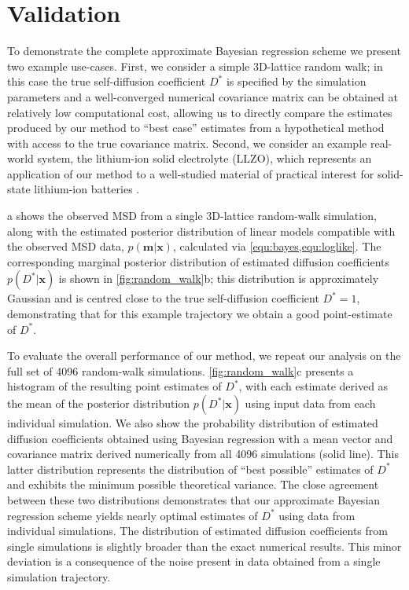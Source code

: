 \documentclass[reprint,superscriptaddress,nobibnotes,amsmath,amssymb,aps,prx,hidelinks]{revtex4-2}
\newcommand{\oMSD}{\ensuremath{\bm{x}}}
\newcommand{\model}{\bm{m}}
\newcommand{\prob}[1]{\ensuremath{p(#1)}}
\newcommand{\D}{\ensuremath{D^*}}
\begin{document}
\section{Validation}

To demonstrate the complete approximate Bayesian regression scheme we present two example use-cases.
First, we consider a simple 3D-lattice random walk; in this case the true self-diffusion coefficient $\D$ is specified by the simulation parameters and a well-converged numerical covariance matrix can be obtained at relatively low computational cost, allowing us to directly compare the estimates produced by our method to ``best case'' estimates from a hypothetical method with access to the true covariance matrix.
Second, we consider an example real-world system, the lithium-ion solid electrolyte  (LLZO), which represents an application of our method to a well-studied material of practical interest for solid-state lithium-ion batteries \cite{MuruganEtAl_AngewChemIntEd2007,burbano_sparse_2016,morgan_lattice_2017,SquiresEtAl_PhysRevMater2022}.

a shows the observed MSD from a single 3D-lattice random-walk simulation, along with the estimated posterior distribution of linear models compatible with the observed MSD data, $\prob{\model|\oMSD}$, calculated via \cref{equ:bayes,equ:loglike}.
The corresponding marginal posterior distribution of estimated diffusion coefficients $\prob{\D|\oMSD}$ is shown in \cref{fig:random_walk}b; this distribution is approximately Gaussian and is centred close to the true self-diffusion coefficient $\D = \num{1}$, demonstrating that for this example trajectory we obtain a good point-estimate of $\D$.

To evaluate the overall performance of our method, we repeat our analysis on the full set of \num{4096} random-walk simulations.
\cref{fig:random_walk}c presents a histogram of the resulting point estimates of $\D$, with each estimate derived as the mean of the posterior distribution $\prob{\D|\oMSD}$ using input data from each individual simulation.
We also show the probability distribution of estimated diffusion coefficients obtained using Bayesian regression with a mean vector and covariance matrix derived numerically from all \num{4096} simulations (solid line).
This latter distribution represents the distribution of ``best possible'' estimates of $\D$ and exhibits the minimum possible theoretical variance.
The close agreement between these two distributions demonstrates that our approximate Bayesian regression scheme yields nearly optimal estimates of $\D$ using data from individual simulations.
The distribution of estimated diffusion coefficients from single simulations is slightly broader than the exact numerical results.
This minor deviation is a consequence of the noise present in data obtained from a single simulation trajectory.
\end{document}
